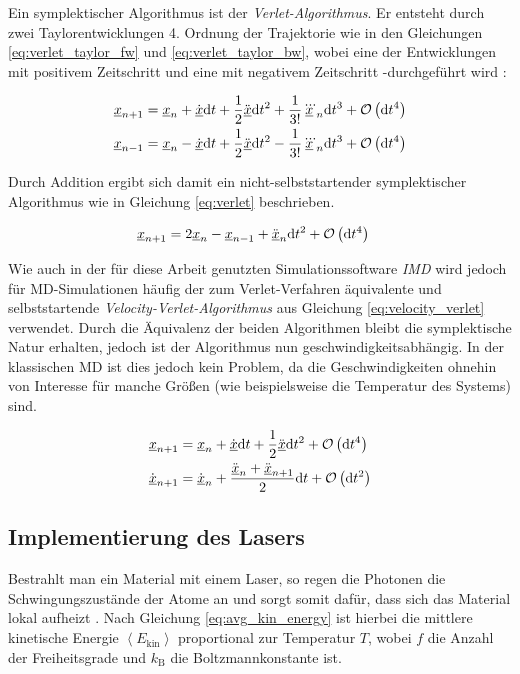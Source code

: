 		Ein symplektischer Algorithmus ist der \emph{Verlet-Algorithmus}. Er entsteht durch zwei
		Taylorentwicklungen 4. Ordnung der Trajektorie wie in den Gleichungen
		\eqref{eq:verlet_taylor_fw} und \eqref{eq:verlet_taylor_bw}, wobei eine der Entwicklungen
		mit positivem Zeitschritt \dt und eine mit negativem Zeitschritt -\dt durchgeführt wird
		\cite[S. 69f]{frenkel2001understanding}:

		\begin{align}
			\underline{x}_{n+1} &= \underline{x}_n + \dot{\underline{x}}\text{d} t + \frac{1}{2}\ddot{\underline{x}}\text{d} t^2
				+ \frac{1}{3!}\dddot{\underline{x}}_n\text{d} t^3 + \operatorname{\mathcal{O}}\left(\text{d} t^4\right)
				\label{eq:verlet_taylor_fw} \\
			\underline{x}_{n-1} &= \underline{x}_n - \dot{\underline{x}}\text{d} t + \frac{1}{2}\ddot{\underline{x}}\text{d} t^2
				- \frac{1}{3!}\dddot{\underline{x}}_n\text{d} t^3 + \operatorname{\mathcal{O}}\left(\text{d} t^4\right)
				\label{eq:verlet_taylor_bw}
		\end{align}

		Durch Addition ergibt sich damit ein nicht-selbststartender symplektischer Algorithmus wie
		in Gleichung \eqref{eq:verlet} beschrieben.

		\begin{align}
			\underline{x}_{n+1} &= 2 \underline{x}_n - \underline{x}_{n-1} + \ddot{\underline{x}}_n\text{d} t^2
				+ \operatorname{\mathcal{O}}\left(\text{d} t^4\right) \label{eq:verlet}
		\end{align}

		Wie auch in der für diese Arbeit genutzten Simulationssoftware \emph{IMD}
		\cite{stadler1997imd} wird jedoch für MD-Simulationen häufig der zum Verlet-Verfahren
		äquivalente und selbststartende \emph{Velocity-Verlet-Algorithmus} aus Gleichung
		\eqref{eq:velocity_verlet} verwendet. Durch die Äquivalenz der beiden Algorithmen bleibt
		die symplektische Natur erhalten, jedoch ist der Algorithmus nun geschwindigkeitsabhängig.
		In der klassischen MD ist dies jedoch kein Problem, da die Geschwindigkeiten ohnehin von
		Interesse für manche Größen (wie beispielsweise die Temperatur des Systems) sind.

		\begin{align}
			\underline{x}_{n+1} &= \underline{x}_n + \dot{\underline{x}}\text{d} t
				+ \frac{1}{2}\ddot{\underline{x}}\text{d} t^2 + \operatorname{\mathcal{O}}\left(\text{d} t^4\right) \nonumber\\
			\dot{\underline{x}}_{n+1} &= \dot{\underline{x}}_n + \frac{\ddot{\underline{x}}_n +
				\ddot{\underline{x}}_{n+1}}{2}\text{d} t + \operatorname{\mathcal{O}}\left(\text{d} t^2\right)
				\label{eq:velocity_verlet}
		\end{align}

	\subsection{Implementierung des Lasers}
		Bestrahlt man ein Material mit einem Laser, so regen die Photonen die Schwingungszustände
		der Atome an und sorgt somit dafür, dass sich das Material lokal aufheizt
		\cite{zhigilei1997velocity}. Nach Gleichung \eqref{eq:avg_kin_energy} ist hierbei die
		mittlere kinetische Energie $\left\langle E_\text{kin} \right\rangle$ proportional zur
		Temperatur $T$, wobei $f$ die Anzahl der Freiheitsgrade und $k_\text{B}$ die
		Boltzmannkonstante ist.

